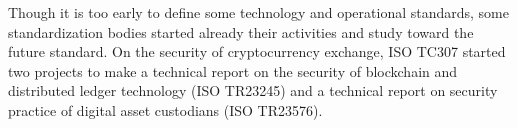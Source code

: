 Though it is too early to define some technology and operational standards,
some standardization bodies started already their activities and study toward the future standard.
On the security of cryptocurrency exchange, ISO TC307 started two projects to make a technical report on the security of blockchain and distributed ledger technology (ISO TR23245) and a technical report on security practice of digital asset custodians (ISO TR23576).
